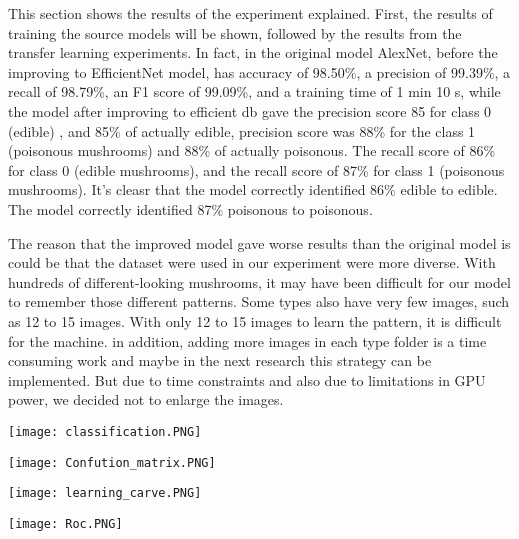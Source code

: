 This section shows the results of the experiment explained. First, the results of training the source models  will be shown, followed by the results from the transfer
learning experiments.
In fact, in the original model AlexNet, before the improving to EfficientNet model, has accuracy of 98.50\%, a precision of 99.39\%, a recall of 98.79\%, an F1 score of 99.09\%, and a training time of 1 min 10 s, while the model after improving to efficient db gave the precision score 85 for class 0 (edible) , and 85\% of actually edible,  precision score was 88\% for the class 1 (poisonous mushrooms)  and 88\% of actually poisonous.
The recall score of 86\% for class 0 (edible mushrooms), and the recall score of 87\% for class 1 (poisonous mushrooms). It's cleasr that the model correctly identified 86\% edible to edible. The model correctly identified 87\% poisonous to poisonous.

The reason that the improved model gave worse results than the original model is could be that the dataset were used in our experiment were more diverse. With hundreds of different-looking mushrooms, it may have been difficult for our model to remember those different patterns. Some types also have very few images, such as 12 to 15 images. With only 12 to 15 images to learn the pattern, it is difficult for the machine. 
in addition, adding more images in each type folder is a time consuming work and maybe in the next research this strategy can be implemented. But due to time constraints and also due to limitations in GPU power, we decided not to enlarge the images.

\centering
\texttt{[image: classification.PNG]}
\hfill \break



\centering
\texttt{[image: Confution\_matrix.PNG]}
\hfill \break

\centering
\texttt{[image: learning\_carve.PNG]}
\hfill \break

\centering
\texttt{[image: Roc.PNG]}
\hfill \break


